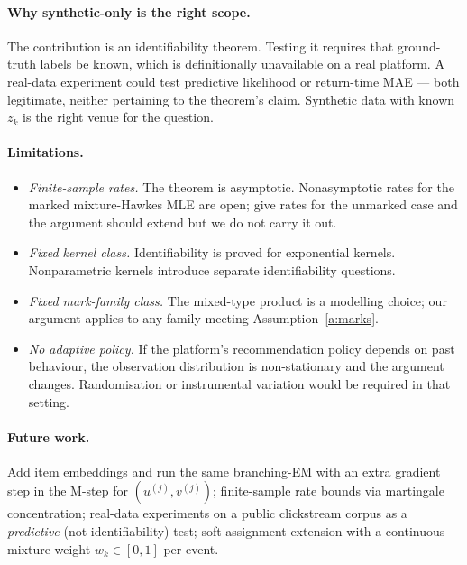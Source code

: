 \documentclass[11pt]{article}
\theoremstyle{remark}
\begin{document}
\paragraph{Why synthetic-only is the right scope.}
The contribution is an identifiability theorem. Testing it requires that ground-truth labels be known, which is definitionally unavailable on a real platform. A real-data experiment could test predictive likelihood or return-time MAE --- both legitimate, neither pertaining to the theorem's claim. Synthetic data with known $z_k$ is the right venue for the question.

\paragraph{Limitations.}
\begin{itemize}[leftmargin=*,nosep]
\item \emph{Finite-sample rates.} The theorem is asymptotic. Nonasymptotic rates for the marked mixture-Hawkes MLE are open; \citet{gao2018consistency} give rates for the unmarked case and the argument should extend but we do not carry it out.
\item \emph{Fixed kernel class.} Identifiability is proved for exponential kernels. Nonparametric kernels introduce separate identifiability questions.
\item \emph{Fixed mark-family class.} The mixed-type product is a modelling choice; our argument applies to any family meeting Assumption~\ref{a:marks}.
\item \emph{No adaptive policy.} If the platform's recommendation policy depends on past behaviour, the observation distribution is non-stationary and the argument changes. Randomisation or instrumental variation would be required in that setting.
\end{itemize}

\paragraph{Future work.}
Add item embeddings and run the same branching-EM with an extra gradient step in the M-step for $(u^{(j)}, v^{(j)})$; finite-sample rate bounds via martingale concentration; real-data experiments on a public clickstream corpus as a \emph{predictive} (not identifiability) test; soft-assignment extension with a continuous mixture weight $w_k \in [0,1]$ per event.

\end{document}
